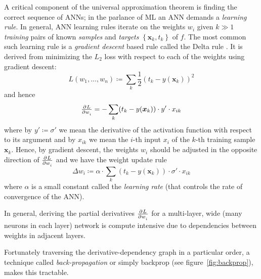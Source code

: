 A critical component of the universal approximation theorem is finding the correct sequence of ANNs; in the parlance of ML an ANN demands a \textit{learning rule}.
%
In general, ANN learning rules iterate on the weights \(w_i\) given \(k \gg 1\) \textit{training} pairs of known \textit{samples} and \textit{targets} \(\left\{ \bm{x}_k, t_k \right\}\) of \(f\). 
%
The most common such learning rule is a \textit{gradient descent} based rule called the Delta rule \cite{widrow1960adaptive}.
%
It is derived from minimizing the \(L_2\) loss with respect to each of the weights using gradient descent:
\begin{equation}
    L(w_1, \dots, w_n) \coloneqq \sum_k \frac{1}{2} (t_k - y(\mathbf{x}_k))^2
    \label{eqn:loss}
\end{equation}
and hence
\begin{equation}
    \pd{L}{w_i} = - \sum_k(t_k-y(\bm{x}_k))\cdot y'\cdot x_{ik}
\end{equation}
where by \(y' \coloneqq \sigma'\) we mean the derivative of the activation function with respect to its argument and by \(x_{ik}\) we mean the \(i\)-th input \(x_i\) of the \(k\)-th training sample \(\bm{x}_k\).
%
Hence, by gradient descent, the weights \(w_i\) should be adjusted in the opposite direction of \(\pd{L}{w_i}\) and we have the weight update rule
\begin{equation}
    \Delta w_i \coloneqq \alpha \cdot \sum_k(t_k-y(\mathbf{x}_k))\cdot \sigma'\cdot x_{ik}
    \label{eqn:batchupdate}
\end{equation}
where \(\alpha\) is a small constant called the \textit{learning rate} (that controls the rate of convergence of the ANN).

In general, deriving the partial derivatives \(\pd{L}{w_i}\) for a multi-layer, wide (many neurons in each layer) network is compute intensive due to dependencies between weights in adjacent layers.
%

Fortunately traversing the derivative-dependency graph in a particular order, a technique called \textit{back-propagation} or simply backprop (see figure~\ref{fig:backprop}), makes this tractable.

